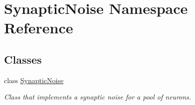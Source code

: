 \hypertarget{namespace_synaptic_noise}{}\section{Synaptic\+Noise Namespace Reference}
\label{namespace_synaptic_noise}
\subsection*{Classes}
\begin{DoxyCompactItemize}
\item 
class \hyperlink{class_synaptic_noise_1_1_synaptic_noise}{Synaptic\+Noise}
\begin{DoxyCompactList}\small\item\em Class that implements a synaptic noise for a pool of neurons. \end{DoxyCompactList}\end{DoxyCompactItemize}
